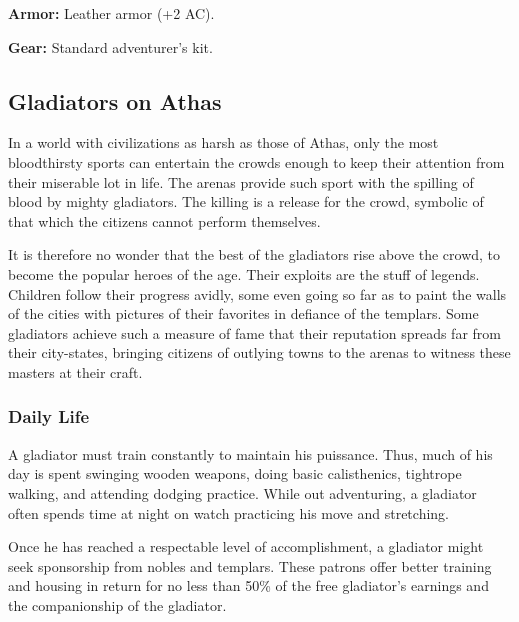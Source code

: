 \textbf{Armor:} Leather armor (+2 AC).

\textbf{Gear:} Standard adventurer's kit.

\subsection{Gladiators on Athas}

In a world with civilizations as harsh as those of Athas, only the most bloodthirsty sports can entertain the crowds enough to keep their attention from their miserable lot in life. The arenas provide such sport with the spilling of blood by mighty gladiators. The killing is a release for the crowd, symbolic of that which the citizens cannot perform themselves.

It is therefore no wonder that the best of the gladiators rise above the crowd, to become the popular heroes of the age. Their exploits are the stuff of legends. Children follow their progress avidly, some even going so far as to paint the walls of the cities with pictures of their favorites in defiance of the templars. Some gladiators achieve such a measure of fame that their reputation spreads far from their city-states, bringing citizens of outlying towns to the arenas to witness these masters at their craft.

\subsubsection{Daily Life}

A gladiator must train constantly to maintain his puissance. Thus, much of his day is spent swinging wooden weapons, doing basic calisthenics, tightrope walking, and attending dodging practice. While out adventuring, a gladiator often spends time at night on watch practicing his move and stretching.

Once he has reached a respectable level of accomplishment, a gladiator might seek sponsorship from nobles and templars. These patrons offer better training and housing in return for no less than 50\% of the free gladiator's earnings and the companionship of the gladiator.

